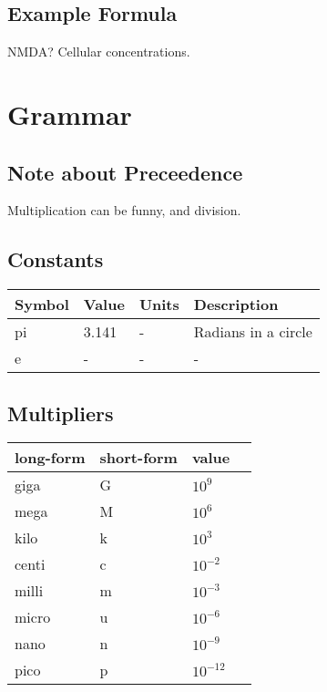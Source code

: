 \documentclass{article}
\begin{document}
\subsection{Example Formula}
\begin{description}
\item NMDA? Cellular concentrations.
\end{description}



\newpage
\section*{Grammar}


\subsection*{Note about Preceedence}
Multiplication can be funny, and division.


\subsection*{Constants}
\begin{center}
    \begin{tabular}{ | l | l |  l | p{5cm} |}
    \hline
    Symbol & Value & Units & Description  \\ \hline
    pi & 3.141 & - & Radians in a circle \\ \hline
    e & - & - & - \\ \hline
    \end{tabular}
\end{center}


\subsection*{Multipliers}


\begin{center}
    \begin{tabular}{ | l | l |  l | p{5cm} |}
    \hline
    long-form & short-form & value  \\ \hline
    giga & G & $10^9$ \\ \hline
    mega & M & $10^6$ \\ \hline
    kilo & k & $10^3$ \\ \hline
    centi & c & $10^{-2}$ \\ \hline
    milli & m & $10^{-3}$ \\ \hline
    micro & u & $10^{-6}$ \\ \hline
    nano & n & $10^{-9}$ \\ \hline
    pico & p & $10^{-12}$ \\ \hline
    \end{tabular}
\end{center}
\end{document}
